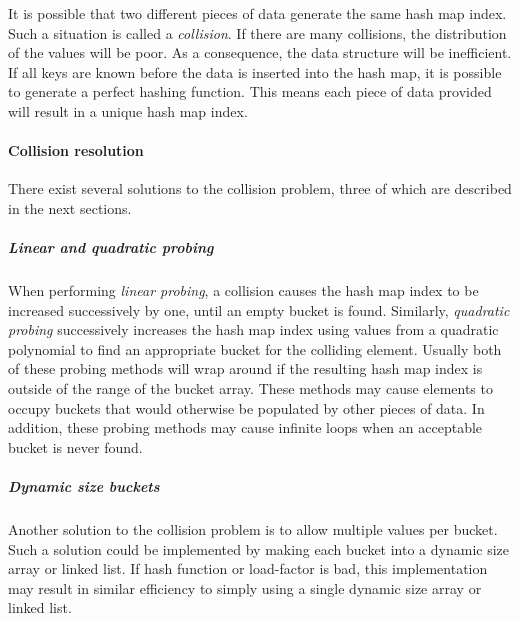 \documentclass{article}
\begin{document}
It is possible that two different pieces of data generate the same hash map index.
Such a situation is called a {\em collision}. If there are many collisions, the distribution of the values
will be poor. As a consequence, the data structure will be inefficient.
If all keys are known before the data is inserted into the hash map, it is possible to generate a perfect
hashing function. This means each piece of data provided will result in a unique hash map index.

\paragraph{Collision resolution}
There exist several solutions to the collision problem, three of which are described in the next sections.

\subparagraph{Linear and quadratic probing}
When performing {\em linear probing}, a collision causes the hash map index to be increased successively by one,
until an empty bucket is found. Similarly, {\em quadratic probing} successively increases the hash map index using
values from a quadratic polynomial to find an appropriate bucket for the colliding element. Usually both of these
probing methods will wrap around if the resulting hash map index is outside of the range of the bucket array.
These methods may cause elements to occupy buckets that would otherwise be populated by other pieces of data.
In addition, these probing methods may cause infinite loops when an acceptable bucket is never found.

\subparagraph{Dynamic size buckets}
Another solution to the collision problem is to allow multiple values per bucket. Such a solution could be
implemented by making each bucket into a dynamic size array or linked list. If hash function or load-factor is bad,
this implementation may result in similar efficiency to simply using a single dynamic size array or linked list.


\end{document}
